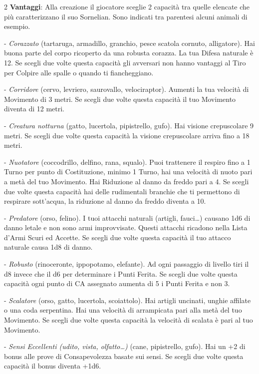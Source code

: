 \begin{multicols}{2}
\textbf{Vantaggi}: Alla creazione il giocatore sceglie 2 capacità tra quelle elencate che più caratterizzano il suo Sornelian. Sono indicati tra parentesi alcuni animali di esempio.

- \emph{Corazzato} (tartaruga, armadillo, granchio, pesce scatola cornuto, alligatore). Hai buona parte del corpo ricoperto da una robusta corazza. La tua Difesa naturale è 12. Se scegli due volte questa capacità gli avversari non hanno vantaggi al Tiro per Colpire alle spalle o quando ti fiancheggiano.

- \emph{Corridore} (cervo, levriero, saurovallo, velociraptor). Aumenti la tua velocità di Movimento di 3 metri. Se scegli due volte questa capacità il tuo Movimento diventa di 12 metri.

- \emph{Creatura notturna} (gatto, lucertola, pipistrello, gufo). Hai visione crepuscolare 9 metri. Se scegli due volte questa capacità la visione crepuscolare arriva fino a 18 metri.

- \emph{Nuotatore} (coccodrillo, delfino, rana, squalo). Puoi trattenere il respiro fino a 1 Turno per punto di Costituzione, minimo 1 Turno, hai una velocità di nuoto pari a metà del tuo Movimento. Hai Riduzione al danno da freddo pari a 4. Se scegli due volte questa capacità hai delle rudimentali branchie che ti permettono di respirare sott'acqua, la riduzione al danno da freddo diventa a 10.

- \emph{Predatore} (orso, felino). I tuoi attacchi naturali (artigli, fauci…) causano 1d6 di danno letale e non sono armi improvvisate. Questi attacchi ricadono nella Lista d'Armi Scuri ed Accette. Se scegli due volte questa capacità il tuo attacco naturale causa 1d8 di danno.

- \emph{Robusto} (rinoceronte, ippopotamo, elefante). Ad ogni passaggio di livello tiri il d8 invece che il d6 per determinare i Punti Ferita. Se scegli due volte questa capacità ogni punto di CA assegnato aumenta di 5 i Punti Ferita e non 3.

- \emph{Scalatore} (orso, gatto, lucertola, scoiattolo). Hai artigli uncinati, unghie affilate o una coda serpentina. Hai una velocità di arrampicata pari alla metà del tuo Movimento. Se scegli due volte questa capacità la velocità di scalata è pari al tuo Movimento.

- \emph{Sensi Eccellenti (udito, vista, olfatto…)} (cane, pipistrello, gufo). Hai un +2 di bonus alle prove di Consapevolezza basate sui sensi. Se scegli due volte questa capacità il bonus diventa +1d6.


\end{multicols}
